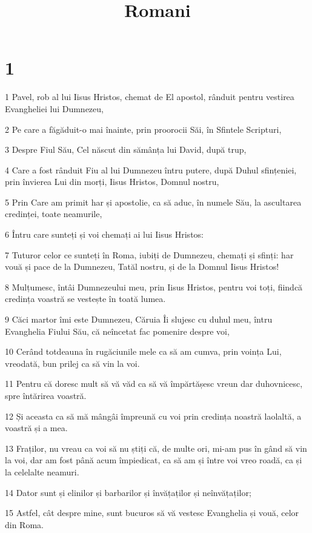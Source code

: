 

\title{Romani}


\chapter{1}

\par 1 Pavel, rob al lui Iisus Hristos, chemat de El apostol, rânduit pentru vestirea Evangheliei lui Dumnezeu,
\par 2 Pe care a făgăduit-o mai înainte, prin proorocii Săi, în Sfintele Scripturi,
\par 3 Despre Fiul Său, Cel născut din sămânța lui David, după trup,
\par 4 Care a fost rânduit Fiu al lui Dumnezeu întru putere, după Duhul sfințeniei, prin învierea Lui din morți, Iisus Hristos, Domnul nostru,
\par 5 Prin Care am primit har și apostolie, ca să aduc, în numele Său, la ascultarea credinței, toate neamurile,
\par 6 Întru care sunteți și voi chemați ai lui Iisus Hristos:
\par 7 Tuturor celor ce sunteți în Roma, iubiți de Dumnezeu, chemați și sfinți: har vouă și pace de la Dumnezeu, Tatăl nostru, și de la Domnul Iisus Hristos!
\par 8 Mulțumesc, întâi Dumnezeului meu, prin Iisus Hristos, pentru voi toți, fiindcă credința voastră se vestește în toată lumea.
\par 9 Căci martor îmi este Dumnezeu, Căruia Îi slujesc cu duhul meu, întru Evanghelia Fiului Său, că neîncetat fac pomenire despre voi,
\par 10 Cerând totdeauna în rugăciunile mele ca să am cumva, prin voința Lui, vreodată, bun prilej ca să vin la voi.
\par 11 Pentru că doresc mult să vă văd ca să vă împărtășesc vreun dar duhovnicesc, spre întărirea voastră.
\par 12 Și aceasta ca să mă mângâi împreună cu voi prin credința noastră laolaltă, a voastră și a mea.
\par 13 Fraților, nu vreau ca voi să nu știți că, de multe ori, mi-am pus în gând să vin la voi, dar am fost până acum împiedicat, ca să am și între voi vreo roadă, ca și la celelalte neamuri.
\par 14 Dator sunt și elinilor și barbarilor și învățaților și neînvățaților;
\par 15 Astfel, cât despre mine, sunt bucuros să vă vestesc Evanghelia și vouă, celor din Roma.
